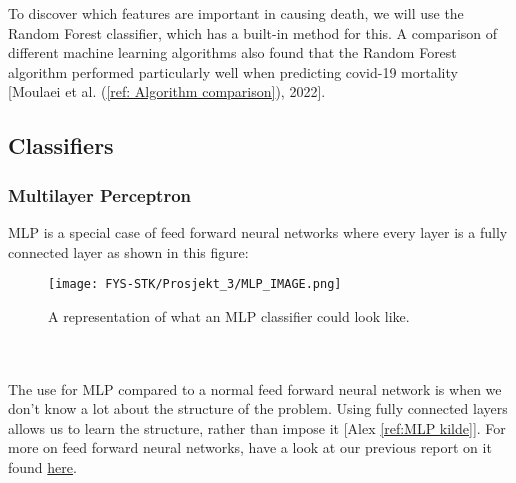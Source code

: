 \documentclass[english,notitlepage,reprint,nofootinbib]{revtex4-1}  %
\begin{document}
To discover which features are important in causing death, we will use the Random Forest classifier, which has a built-in method for this. A comparison of different machine learning algorithms also found that the Random Forest algorithm performed particularly well when predicting covid-19 mortality [Moulaei et al. (\ref{ref: Algorithm comparison}), 2022].

\subsection{Classifiers}
\subsubsection{Multilayer Perceptron}
MLP is a special case of feed forward neural networks where every layer is a fully connected layer as shown in this figure:

\begin{figure}[H]
    \centering
    \texttt{[image: FYS-STK/Prosjekt\_3/MLP\_IMAGE.png]}
    \caption{A representation of what an MLP classifier could look like.}
    \label{fig: 1}
\end{figure}
\\
\\
The use for MLP compared to a normal feed forward neural network is when we don't know a lot about the structure of the problem. Using fully connected layers allows us to learn the structure, rather than impose it [Alex \ref{ref:MLP kilde}]. 
For more on feed forward neural networks, have a look at our previous report on it found \href{https://github.com/erlend1202/FYS_STK4155_Prosjekt_2}{here}.


\end{document}
